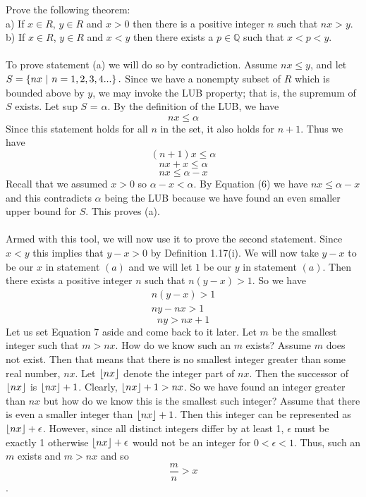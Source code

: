 \documentclass[12pt]{article}
\begin{document}
Prove the following theorem: \\ 
a) If $x \in R$, $y \in R$ and $x>0$ then there is a positive integer $n$ such that $nx>y$. \\
b) If $x \in R$, $y \in R$ and $x<y$ then there exists a $p \in \mathbb{Q}$ such that $x<p<y$. \\ \\
To prove statement (a) we will do so by contradiction. Assume $nx \leq y$, and let $S= \left\{ nx ~|~ n=1,2,3,4...\right\}.$ Since we have a nonempty subset of $R$ which is bounded above by $y$, we may invoke the LUB property; that is, the supremum of $S$ exists. Let sup $S$ = $\alpha$. By the definition of the LUB, we have \begin{equation}
nx \leq \alpha
\end{equation} Since this statement holds for all $n$ in the set, it also holds for $n+1$. Thus we have \begin{equation}
(n+1)x \leq \alpha 
\end{equation}
\begin{equation*}
nx+x \leq \alpha
\end{equation*}
\begin{equation}
nx \leq \alpha - x
\end{equation} 
Recall that we assumed $x>0$ so $\alpha -x < \alpha$. By Equation (6) we have $nx \leq \alpha - x$ and this contradicts $\alpha$ being the LUB because we have found an even smaller upper bound for $S$. This proves (a). \\ \\
Armed with this tool, we will now use it to prove the second statement. Since $x<y$ this implies that $y-x>0$ by Definition 1.17(i). We will now take $y-x$ to be our $x$ in statement $(a)$ and we will let $1$ be our $y$ in statement $(a)$. Then there exists a positive integer $n$ such that $n(y-x)>1$. So we have
\begin{align*}
n(y-x)>1 \\
ny-nx>1
\end{align*} \begin{equation}
ny>nx+1
\end{equation}
Let us set Equation 7 aside and come back to it later. Let $m$ be the smallest integer such that $m>nx$. How do we know such an $m$ exists? Assume $m$ does not exist. Then that means that there is no smallest integer greater than some real number, $nx$. Let $\left\lfloor nx \right\rfloor$  denote the integer part of $nx$. Then the successor of $\left\lfloor nx \right\rfloor$ is $\left\lfloor nx \right\rfloor+1$. Clearly, $\left\lfloor nx \right\rfloor+1>nx$. So we have found an integer greater than $nx$ but how do we know this is the smallest such integer? Assume that there is even a smaller integer than $\left\lfloor nx \right\rfloor+1$. Then this integer can be represented as $\left\lfloor nx \right\rfloor+ \epsilon$. However, since all distinct integers differ by at least 1, $\epsilon$ must be exactly 1 otherwise $\left\lfloor nx \right\rfloor+ \epsilon$ would not be an integer for $0< \epsilon <1$. Thus, such an $m$ exists and $m>nx$ and so \begin{equation}
\dfrac{m}{n} > x
\end{equation}. \\
\end{document}
